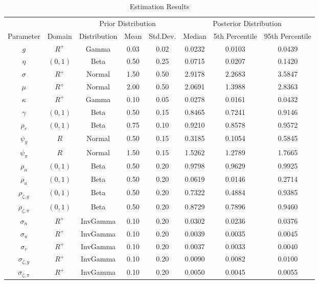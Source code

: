 \documentclass[12pt]{article}
\begin{document}
{\begin{table}\caption{Estimation Results}
\begin{center}
\begin{tabular}{c|c||c|cc||c|cc}
\multicolumn{2}{c}{} & \multicolumn{3}{c}{Prior Distribution} & \multicolumn{3}{c}{Posterior Distribution} \\ 
Parameter & Domain & Distribution & Mean & Std.Dev. & Median & 5th Percentile & 95th Percentile \\ \hline 
$g$ & ${R}^{+}$ & Gamma & 0.03 & 0.02 & 0.0232 & 0.0103 & 0.0439 \\ 
$\eta$ & $(0,1)$ & Beta & 0.50 & 0.25 & 0.0715 & 0.0207 & 0.1420 \\ 
$\sigma$ & ${R}^{+}$ & Normal & 1.50 & 0.50 & 2.9178 & 2.2683 & 3.5847 \\ 
$\mu$ & ${R}^{+}$ & Normal & 2.00 & 0.50 & 2.0691 & 1.3988 & 2.8363 \\ 
$\kappa$ & ${R}^{+}$ & Gamma & 0.10 & 0.05 & 0.0278 & 0.0161 & 0.0432 \\ 
$\gamma$ & $(0,1)$ & Beta & 0.50 & 0.15 & 0.8465 & 0.7241 & 0.9146 \\ 
$\rho_r$ & $(0,1)$ & Beta & 0.75 & 0.10 & 0.9210 & 0.8578 & 0.9572 \\ 
$\psi_y$ & ${R}$ & Normal & 0.50 & 0.15 & 0.3185 & 0.1054 & 0.5845 \\ 
$\psi_{\pi}$ & ${R}$ & Normal & 1.50 & 0.15 & 1.5262 & 1.2789 & 1.7665 \\ 
$\rho_n$ & $(0,1)$ & Beta & 0.50 & 0.20 & 0.9798 & 0.9629 & 0.9925 \\ 
$\rho_u$ & $(0,1)$ & Beta & 0.50 & 0.20 & 0.0619 & 0.0146 & 0.2714 \\ 
$\rho_{\zeta,y}$ & $(0,1)$ & Beta & 0.50 & 0.20 & 0.7322 & 0.4884 & 0.9385 \\ 
$\rho_{\zeta,\pi}$ & $(0,1)$ & Beta & 0.50 & 0.20 & 0.8729 & 0.7896 & 0.9460 \\ 
$\sigma_{n}$ & ${R}^{+}$ & InvGamma & 0.10 & 0.20 & 0.0302 & 0.0236 & 0.0376 \\ 
$\sigma_{u}$ & ${R}^{+}$ & InvGamma & 0.10 & 0.20 & 0.0039 & 0.0035 & 0.0045 \\ 
$\sigma_{r}$ & ${R}^{+}$ & InvGamma & 0.10 & 0.20 & 0.0037 & 0.0033 & 0.0040 \\ 
$\sigma_{\zeta,y}$ & ${R}^{+}$ & InvGamma & 0.10 & 0.20 & 0.0090 & 0.0082 & 0.0100 \\ 
$\sigma_{\zeta,\pi}$ & ${R}^{+}$ & InvGamma & 0.10 & 0.20 & 0.0050 & 0.0045 & 0.0055 \\ 

\end{tabular}
\end{center}
\end{table}}
\end{document}

